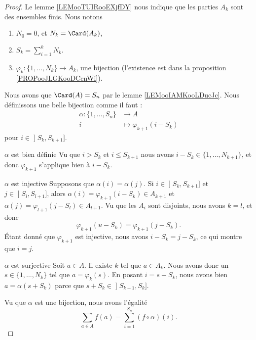 \begin{proof}
    Le lemme \ref{LEMooTUIRooEXjfDY} nous indique que les parties \( A_k\) sont des ensembles finis. Nous notons
    \begin{enumerate}
        \item
            \( N_0=0\), et \( N_k=\Card(A_k)\),
        \item
            \( S_k=\sum_{i=1}^kN_k\).
        \item
            \( \varphi_k\colon \{ 1,\ldots, N_k \}\to A_k\), une bijection (l'existence est dans la proposition \ref{PROPooJLGKooDCcnWi}).
    \end{enumerate}
    Nous avons que \( \Card(A)=S_n\) par le lemme \ref{LEMooIAMKooLDucJc}. Nous définissons une belle bijection comme il faut :
    \begin{equation}
        \begin{aligned}
            \alpha\colon \{ 1,\ldots, S_n \}&\to A \\
            i&\mapsto \varphi_{k+1}(i-S_k) 
        \end{aligned}
    \end{equation}
    pour \( i\in\mathopen] S_k , S_{k+1} \mathclose]\).

    \begin{subproof}
        \item[\( \alpha\) est bien définie]
            Vu que \( i>S_k\) et \( i\leq S_{k+1}\) nous avons \( i-S_k\in \{ 1,\ldots, N_{k+1} \}\), et donc \( \varphi_{k+1}\) s'applique bien à \( i-S_k\).
        \item[\( \alpha\) est injective]
        Supposons que \( \alpha(i)=\alpha(j)\). Si \( i\in \mathopen] S_k , S_{k+1} \mathclose]\) et \( j\in \mathopen] S_l , S_{l+1} \mathclose]\), alors \( \alpha(i)=\varphi_{k+1}(i-S_k)\in A_{k+1}\) et \( \alpha(j)=\varphi_{l+1}(j-S_l)\in A_{l+1}\). Vu que les \( A_i\) sont disjoints, nous avons \( k=l\), et donc
        \begin{equation}
            \varphi_{k+1}(u-S_k)=\varphi_{k+1}(j-S_k).
        \end{equation}
        Étant donné que \( \varphi_{k+1}\) est injective, nous avons \( i-S_k=j-S_k\), ce qui montre que \( i=j\).
    \item[\( \alpha\) est surjective]
    Soit \( a\in A\). Il existe \( k\) tel que \( a\in A_k\). Nous avons donc un \( s\in\{ 1,\ldots, N_k \}\) tel que \( a=\varphi_k(s)\). En posant \( i=s+S_k\), nous avons bien \( a=\alpha(s+S_k)\) parce que \( s+S_k\in \mathopen] S_{k-1} , S_k \mathclose]\).
    \end{subproof}
    Vu que \( \alpha\) est une bijection, nous avons l'égalité
    \begin{equation}
        \sum_{a\in A}f(a)=\sum_{i=1}^{S_n}(f\circ \alpha)(i).
    \end{equation}
    

\end{proof}
